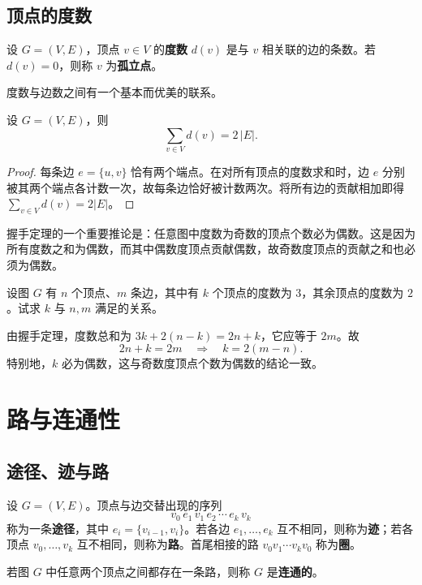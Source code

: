 	\subsection{顶点的度数}
	\begin{definition}[度数]
		设 $G=(V,E)$，顶点 $v\in V$ 的\textbf{度数} $d(v)$ 是与 $v$ 相关联的边的条数。若 $d(v)=0$，则称 $v$ 为\textbf{孤立点}。
	\end{definition}

	度数与边数之间有一个基本而优美的联系。

	\begin{theorem}[握手定理]\label{thm:handshake}
		设 $G=(V,E)$，则
		\[
			\sum_{v\in V} d(v)=2\,|E|.
		\]
	\end{theorem}
	\begin{proof}
		每条边 $e=\{u,v\}$ 恰有两个端点。在对所有顶点的度数求和时，边 $e$ 分别被其两个端点各计数一次，故每条边恰好被计数两次。将所有边的贡献相加即得 $\sum_{v\in V}d(v)=2|E|$。
	\end{proof}

	握手定理的一个重要推论是：任意图中度数为奇数的顶点个数必为偶数\cite{graphart}。这是因为所有度数之和为偶数，而其中偶数度顶点贡献偶数，故奇数度顶点的贡献之和也必须为偶数。

	\begin{exercise}\label{ex:degree}
		设图 $G$ 有 $n$ 个顶点、$m$ 条边，其中有 $k$ 个顶点的度数为 $3$，其余顶点的度数为 $2$。试求 $k$ 与 $n,m$ 满足的关系。
	\end{exercise}
	\begin{solution}
		由握手定理，度数总和为 $3k+2(n-k)=2n+k$，它应等于 $2m$。故
		\[
			2n+k=2m\quad\Longrightarrow\quad k=2(m-n).
		\]
		特别地，$k$ 必为偶数，这与奇数度顶点个数为偶数的结论一致。
	\end{solution}

	\section{路与连通性}
	\subsection{途径、迹与路}
	设 $G=(V,E)$。顶点与边交替出现的序列
	\[
		v_0\,e_1\,v_1\,e_2\,\cdots\,e_k\,v_k
	\]
	称为一条\textbf{途径}，其中 $e_i=\{v_{i-1},v_i\}$。若各边 $e_1,\dots,e_k$ 互不相同，则称为\textbf{迹}；若各顶点 $v_0,\dots,v_k$ 互不相同，则称为\textbf{路}。首尾相接的路 $v_0v_1\cdots v_kv_0$ 称为\textbf{圈}。

	\begin{definition}[连通性]
		若图 $G$ 中任意两个顶点之间都存在一条路，则称 $G$ 是\textbf{连通的}。
	\end{definition}

